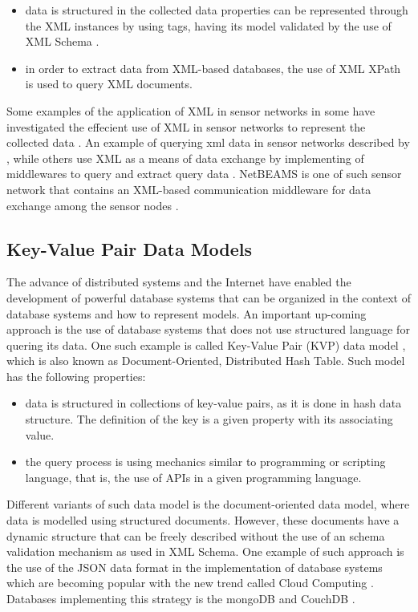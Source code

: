 \begin{itemize}
  \item data is structured in the collected data properties can be represented through the
XML \cite{xml} instances by using tags, having its model validated by the use
of XML Schema \cite{xml-schema}.
  \item in order to extract data from XML-based databases, the use of XML XPath
  is used to query XML documents.
\end{itemize}

Some examples of the application of XML in sensor networks in 
\cite{sn-xml-usage02} some have investigated the effecient use of XML in
sensor networks to represent the collected data \cite{sn-xml-usage01}. An
example of querying xml data in sensor networks described by
\cite{sn-xml-query-engines}, while others use XML as a means of data exchange
by implementing of middlewares to query and extract query data
\cite{sn-xml-middleware}. NetBEAMS is one of such sensor network that contains
an XML-based communication middleware for data exchange among the sensor nodes
\cite{netbeams2009}.

\subsection{Key-Value Pair Data Models}

The advance of distributed systems and the Internet have enabled the
development of powerful database systems that can be organized in the context
of database systems and how to represent models. An important up-coming
approach is the use of database systems that does not use structured language
for quering its data. One such example is called Key-Value Pair (KVP) data model
\cite{db-kvp}, which is also known as Document-Oriented, Distributed Hash Table.
Such model has the following properties:

\begin{itemize}
  \item data is structured in collections of key-value pairs, as it is done in
  hash data structure. The definition of the key is a given property with its
  associating value.
  \item the query process is using mechanics similar to programming or
  scripting language, that is, the use of APIs in a given programming language.
\end{itemize}

Different variants of such data model is the document-oriented data model,
where data is modelled using structured documents. However, these documents
have a dynamic structure that can be freely described without the use of an
schema validation mechanism as used in XML Schema. One example of such
approach is the use of the JSON data format \cite{json} in the implementation
of database systems which are becoming popular with the new trend called Cloud
Computing \cite{cloud-comp-architectures}. Databases implementing this strategy
is the mongoDB \cite{mongodb} and CouchDB \cite{mongodb}.

